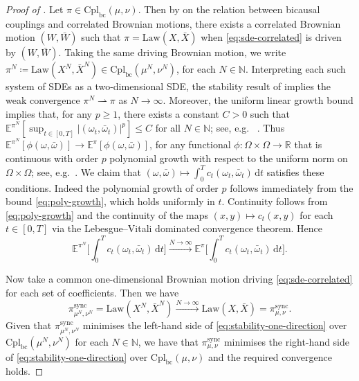 \documentclass[onseside, final]{amsart}
\theoremstyle{definition}
\newcommand{\N}{\mathbb N}
\newcommand{\R}{\mathbb R}
\newcommand{\E}{\mathbb E}
\newcommand{\Law}{\mathrm{Law}}
\newcommand{\D}{\,\mathrm{d}}
\newcommand{\cpl}{\mathrm{Cpl}}
\newcommand{\cplba}{\cpl_{\mathrm{bc}}}
\newcommand{\cplbc}{\cpl_{\mathrm{bc}}}
\newcommand{\sync}{\mathrm{sync}}
\numberwithin{equation}{section}
\begin{document}
	\begin{proof}[Proof of ]
		Let $\pi \in \cplbc(\mu, \nu)$. Then by \cite[Proposition 2.2]{BaKaRo22} on the relation between bicausal couplings and correlated Brownian motions, there exists a correlated Brownian motion $(W, \bar W)$ such that $\pi = \Law(X, \bar X)$ when \eqref{eq:sde-correlated} is driven by $(W, \bar W)$. Taking the same driving Brownian motion, we write $\pi^N \coloneqq \Law(X^N, \bar X^N) \in \cplbc(\mu^N, \nu^N)$, for each $N \in \N$. Interpreting each such system of SDEs as a two-dimensional SDE, the stability result of \citet[Theorem 11.1.4]{StVa79} implies the weak convergence $\pi^N \rightharpoonup \pi$ as $N \to \infty$. Moreover, the uniform linear growth bound implies that, for any $p \geq 1$, there exists a constant $C > 0$ such that $\E^{\pi^N}[\sup_{t \in [0, T]}|(\omega_t, \bar \omega_t)|^p] \leq C$ for all $N \in \N$; see, e.g.~ \cite[Lemma 3.8]{GiSk79}. Thus $\E^{\pi^N}[\phi(\omega, \bar \omega)] \to \E^\pi[\phi(\omega, \bar \omega)]$, for any functional $\phi \colon \Omega \times \Omega \to \R$ that is continuous with order $p$ polynomial growth with respect to the uniform norm on $\Omega \times \Omega$; see, e.g.~\cite[Definition 6.8]{Vi09}. We claim that $(\omega, \bar \omega) \mapsto \int_0^T c_t(\omega_t, \bar \omega_t) \D t$ satisfies these conditions. Indeed the polynomial growth of order $p$ follows immediately from the bound \eqref{eq:poly-growth}, which holds uniformly in $t$. Continuity follows from \eqref{eq:poly-growth} and the continuity of the maps $(x, y) \mapsto c_t(x, y)$ for each $t \in [0, T]$ via the Lebesgue--Vitali dominated convergence theorem. Hence
		\begin{equation}\label{eq:stability-one-direction}
			\E^{\pi^N}\biggl[\int_0^Tc_t(\omega_t, \bar \omega_t) \D t\biggr] \xrightarrow{N \to \infty} \E^\pi\biggl[\int_0^Tc_t(\omega_t, \bar \omega_t) \D t\biggr].
		\end{equation}
		
		Now take a common one-dimensional Brownian motion driving \eqref{eq:sde-correlated} for each set of coefficients. Then we have
		\begin{equation}
			\pi^\sync_{\mu^N, \nu^N} = \Law(X^N, \bar X^N) \xrightarrow{N \to \infty} \Law(X, \bar X) = \pi^\sync_{\mu, \nu}.
		\end{equation}
		Given that $\pi^\sync_{\mu^N, \nu^N}$ minimises the left-hand side of \eqref{eq:stability-one-direction} over $\cplba(\mu^N, \nu^N)$ for each $N \in \N$, we have that $\pi^\sync_{\mu, \nu}$ minimises the right-hand side of \eqref{eq:stability-one-direction} over $\cplba(\mu, \nu)$ and the required convergence holds.
	\end{proof}
	
\end{document}

